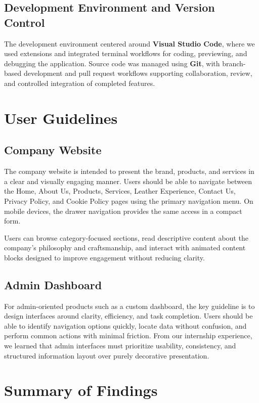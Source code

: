\documentclass[12pt, oneside, a4paper]{book}
\begin{document}
\begin{doublespace}
\subsection{Development Environment and Version Control}

The development environment centered around \textbf{Visual Studio Code}, where we used
extensions and integrated terminal workflows for coding, previewing, and debugging the
application. Source code was managed using \textbf{Git}, with branch-based development
and pull request workflows supporting collaboration, review, and controlled integration
of completed features.

\section{User Guidelines}

\subsection{Company Website}

The company website is intended to present the brand, products, and services in a clear
and visually engaging manner. Users should be able to navigate between the Home,
About Us, Products, Services, Leather Experience, Contact Us, Privacy Policy, and
Cookie Policy pages using the primary navigation menu. On mobile devices, the drawer
navigation provides the same access in a compact form.

Users can browse category-focused sections, read descriptive content about the
company's philosophy and craftsmanship, and interact with animated content blocks
designed to improve engagement without reducing clarity.

\subsection{Admin Dashboard}

For admin-oriented products such as a custom dashboard, the key guideline is to design
interfaces around clarity, efficiency, and task completion. Users should be able to
identify navigation options quickly, locate data without confusion, and perform common
actions with minimal friction. From our internship experience, we learned that admin
interfaces must prioritize usability, consistency, and structured information layout
over purely decorative presentation.

\section{Summary of Findings}


\end{doublespace}
\end{document}
